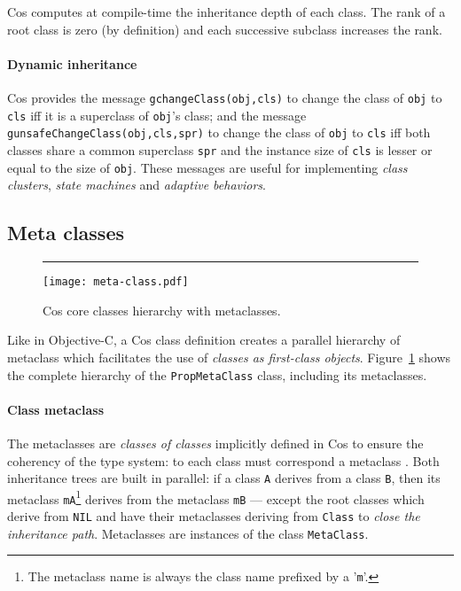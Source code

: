 \documentclass[preprint,10pt]{sigplanconf}
\newcommand{\ProgLang}[1]{{\sc #1}\xspace}
\newcommand{\Cos}       {\ProgLang{Cos}}
\newcommand{\Objc}      {\ProgLang{Objective-C}}
\newcommand{\hr}{\rule{\columnwidth}{0.33pt}}
\newcommand{\code}[1]{\lstinline[language=COS,style=samplecode]|#1|}
\begin{document}
\Cos computes at compile-time the inheritance depth of each class. The rank of a root class is zero (by definition) and each successive subclass increases the rank.

\paragraph{Dynamic inheritance}

\Cos provides the message \code{gchange}\-\code{Class}\code{(obj,cls)} to change the class of \code{obj} to \code{cls} iff it is a superclass of \code{obj}'s class; and the message \code{gunsafe}\-\code{Change}\-\code{Class(obj,cls,spr)} to change the class of \code{obj} to \code{cls} iff both classes share a common superclass \code{spr} and the instance size of \code{cls} is lesser or equal to the size of \code{obj}. These messages are useful for implementing {\em class clusters}, {\em state machines} and {\em adaptive behaviors}.

\subsection{Meta classes\label{ssec:meta}}

\begin{figure}\hr
\begin{center}
\vspace*{-3mm}\hspace*{-7mm}
\texttt{[image: meta-class.pdf]}
\end{center}
\caption{\Cos core classes hierarchy with metaclasses.\label{fig:metatree}}
\end{figure}

Like in \Objc, a \Cos class definition creates a parallel hierarchy of metaclass which facilitates the use of {\em classes as first-class objects}. Figure~\ref{fig:metatree} shows the complete hierarchy of the \code{PropMetaClass} class, including its metaclasses.

\paragraph{Class metaclass}

The metaclasses are {\em classes of classes} implicitly defined in \Cos to ensure the coherency of the type system: to each class must correspond a metaclass \cite{raza04}. Both inheritance trees are built in parallel: if a class \code{A} derives from a class \code{B}, then its metaclass \code{mA}\footnote{The metaclass name is always the class name prefixed by a '\code{m}'.} derives from the metaclass \code{mB} --- except the root classes which derive from \code{NIL} and have their metaclasses deriving from \code{Class} to {\em close the inheritance path}. Metaclasses are instances of the class \code{MetaClass}.
\end{document}
